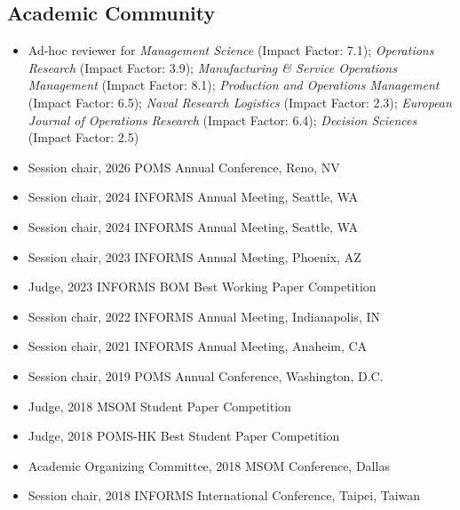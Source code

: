\documentclass[11pt]{article}
\begin{document}
			\subsection*{Academic Community}
			\begin{itemize}
				\item  Ad-hoc reviewer for \emph{Management Science} (Impact Factor: 7.1); \emph{Operations Research} (Impact Factor: 3.9); \emph{Manufacturing \& Service Operations Management} (Impact Factor: 8.1); \emph{Production and Operations Management} (Impact Factor: 6.5); \emph{Naval Research Logistics} (Impact Factor: 2.3); \textit{European Journal of Operations Research} (Impact Factor: 6.4); \textit{Decision Sciences} (Impact Factor: 2.5)
				\item Session chair, 2026 POMS Annual Conference, Reno, NV
				 \item Session chair, 2024 INFORMS Annual Meeting, Seattle, WA
				\item Session chair, 2024 INFORMS Annual Meeting, Seattle, WA
				\item Session chair, 2023 INFORMS Annual Meeting, Phoenix, AZ
				\item Judge, 2023 INFORMS BOM Best Working Paper Competition
				\item Session chair, 2022 INFORMS Annual Meeting, Indianapolis, IN
				\item Session chair, 2021 INFORMS Annual Meeting, Anaheim, CA
				\item Session chair, 2019 POMS Annual Conference, Washington, D.C.
				\item Judge, 2018 MSOM Student Paper Competition
				\item Judge, 2018 POMS-HK Best Student Paper Competition
				\item Academic Organizing Committee, 2018 MSOM Conference, Dallas
				\item Session chair, 2018 INFORMS International Conference, Taipei, Taiwan

%
			\end{itemize}
\end{document}
